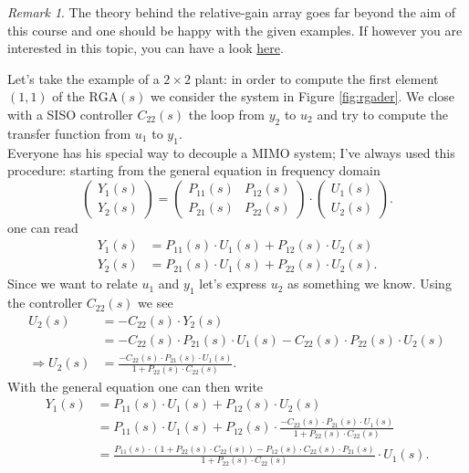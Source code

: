 \documentclass[a4paper,12 pt]{article}
\numberwithin{equation}{section}
\theoremstyle{definition}
\theoremstyle{remark}
\newtheorem*{bmk}{Remark}
\theoremstyle{definition}
\theoremstyle{definition}
\theoremstyle{definition}
\theoremstyle{remark}
\begin{document}
\begin{bmk}
The theory behind the relative-gain array goes far beyond the aim of this course and one should be happy with the given examples. If however you are interested in this topic, you can have a look \href{http://folk.ntnu.no/skoge/vgprosessregulering/papers-pensum/ch3-ch10-2ndedition.pdf}{here}.
\end{bmk}
Let's take the example of a $2\times 2$ plant: in order to compute the first element $(1,1)$ of the $\text{RGA}(s)$ we consider the system in Figure \ref{fig:rgader}. We close with a SISO controller $C_{22}(s)$ the loop from $y_2$ to $u_2$ and try to compute the transfer function from $u_1$ to $y_1$.\\
Everyone has his special way to decouple a MIMO system; I've always used this procedure: starting from the general equation in frequency domain 
\begin{equation}
\begin{pmatrix}
Y_1(s)\\
Y_2(s)
\end{pmatrix}=\begin{pmatrix}
P_{11}(s)&P_{12}(s)\\
P_{21}(s)&P_{22}(s)
\end{pmatrix}\cdot 
\begin{pmatrix}
U_1(s)\\
U_2(s)
\end{pmatrix}.
\end{equation}
one can read
\begin{equation}
\begin{split}
Y_1(s)&=P_{11}(s)\cdot U_1(s)+P_{12}(s)\cdot U_2(s)\\
Y_2(s)&=P_{21}(s)\cdot U_1(s)+P_{22}(s)\cdot U_2(s).
\end{split}
\end{equation}
Since we want to relate $u_1$ and $y_1$ let's express $u_2$ as something we know. Using the controller $C_{22}(s)$ we see
\begin{equation}
\begin{split}
U_2(s)&=-C_{22}(s)\cdot Y_2(s)\\
&=-C_{22}(s)\cdot P_{21}(s)\cdot U_1(s)-C_{22}(s)\cdot P_{22}(s)\cdot U_2(s)\\
\Rightarrow U_2(s)&=\frac{-C_{22}(s)\cdot P_{21}(s) \cdot U_1(s)}{1+P_{22}(s)\cdot C_{22}(s)}.
\end{split}
\end{equation}
With the general equation one can then write
\begin{equation}
\begin{split}
Y_1(s)&=P_{11}(s)\cdot U_1(s)+P_{12}(s)\cdot U_2(s)\\
&=P_{11}(s)\cdot U_1(s)+P_{12}(s)\cdot \frac{-C_{22}(s)\cdot P_{21}(s) \cdot U_1(s)}{1+P_{22}(s)\cdot C_{22}(s)}\\
&=\frac{P_{11}(s)\cdot (1+P_{22}(s)\cdot C_{22}(s))-P_{12}(s)\cdot C_{22}(s)\cdot P_{21}(s)}{1+P_{22}(s)\cdot C_{22}(s)}\cdot U_1(s). 
\end{split}
\end{equation}
\end{document}
